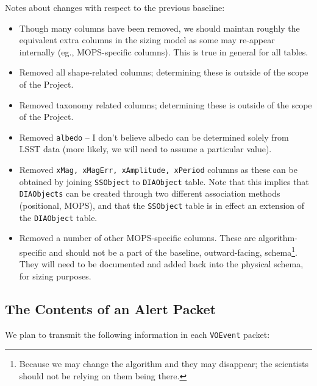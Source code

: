 \documentclass[12pt]{article}
\newcommand{\code}[1]{\texttt{#1}}
\newcommand{\DIAObject}{\code{DIAObject}\xspace}
\newcommand{\DIAObjects}{\code{DIAObjects}\xspace}
\newcommand{\SSObject}{\code{SSObject}\xspace}
\newcommand{\VOEvent}{\code{VOEvent}\xspace}
\begin{document}
Notes about changes with respect to the previous baseline:
\begin{itemize}
\item Though many columns have been removed, we should maintan roughly the equivalent extra columns in the sizing model as some may re-appear internally (eg., MOPS-specific columns). This is true in general for all tables.
\item Removed all shape-related columns; determining these is outside of the scope of the Project.
\item Removed taxonomy related columns; determining these is outside of the scope of the Project.
\item Removed \texttt{albedo} -- I don't believe albedo can be determined solely from LSST data (more likely, we will need to assume a particular value).
\item Removed \texttt{xMag, xMagErr, xAmplitude, xPeriod} columns as these can be obtained by joining \SSObject to \DIAObject table. Note that this implies that \DIAObjects can be created through two different association methods (positional, MOPS), and that the \SSObject table is in effect an extension of the \DIAObject table.
\item Removed a number of other MOPS-specific columns. These are algorithm-specific and should not be a part of the baseline, outward-facing, schema\footnote{Because we may change the algorithm and they may disappear; the scientists should not be relying on them being there.}. They will need to be documented and added back into the physical schema, for sizing purposes.
\end{itemize}


\subsection{The Contents of an Alert Packet}
\label{sec:voEventContents}

We plan to transmit the following information in each \VOEvent packet:
\end{document}
